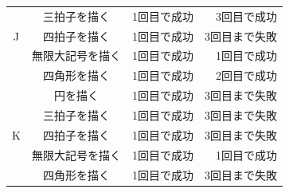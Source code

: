 \documentclass[11pt]{jreport}
\begin{document}
\begin{center}
\begin{longtable}{|c|c|r|r|}
                  & 三拍子を描く & 1回目で成功 & 3回目で成功 \\ \cline{2-4}
                J & 四拍子を描く & 1回目で成功 & 3回目まで失敗 \\ \cline{2-4}
                  & 無限大記号を描く & 1回目で成功 & 1回目で成功 \\ \cline{2-4}
                  & 四角形を描く & 1回目で成功 & 2回目で成功 \\ \hline %
                  & 円を描く & 1回目で成功 & 3回目まで失敗 \\ \cline{2-4}
                  & 三拍子を描く & 1回目で成功 & 3回目まで失敗 \\ \cline{2-4}
                K & 四拍子を描く & 1回目で成功 & 3回目まで失敗 \\ \cline{2-4}
                  & 無限大記号を描く & 1回目で成功 & 1回目で成功 \\ \cline{2-4}
                  & 四角形を描く & 1回目で成功 & 3回目まで失敗 \\ \hline
            \end{longtable}
        \end{center}
\end{document}
